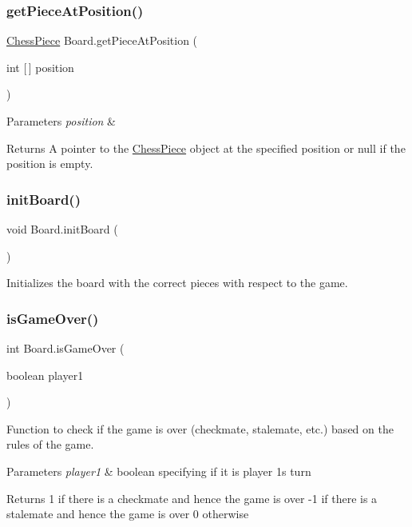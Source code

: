 \subsubsection{\texorpdfstring{get\+Piece\+At\+Position()}{getPieceAtPosition()}}
{\footnotesize\ttfamily \mbox{\hyperlink{class_chess_piece}{Chess\+Piece}} Board.\+get\+Piece\+At\+Position (\begin{DoxyParamCaption}\item[{int \mbox{[}$\,$\mbox{]}}]{position }\end{DoxyParamCaption})}


\begin{DoxyParams}{Parameters}
{\em position} & \\
\hline
\end{DoxyParams}
\begin{DoxyReturn}{Returns}
A pointer to the \mbox{\hyperlink{class_chess_piece}{Chess\+Piece}} object at the specified position or \textquotesingle{}null\textquotesingle{} if the position is empty. 
\end{DoxyReturn}
\mbox{\label{class_board_afe083a69852c9d95ef3f212d5767b1ac}} 
\subsubsection{\texorpdfstring{init\+Board()}{initBoard()}}
{\footnotesize\ttfamily void Board.\+init\+Board (\begin{DoxyParamCaption}{ }\end{DoxyParamCaption})}

Initializes the board with the correct pieces with respect to the game. \mbox{\label{class_board_a8e6efbc4d3b024ca11d5037962c01283}} 
\subsubsection{\texorpdfstring{is\+Game\+Over()}{isGameOver()}}
{\footnotesize\ttfamily int Board.\+is\+Game\+Over (\begin{DoxyParamCaption}\item[{boolean}]{player1 }\end{DoxyParamCaption})}

Function to check if the game is over (checkmate, stalemate, etc.) based on the rules of the game. 
\begin{DoxyParams}{Parameters}
{\em player1} & boolean specifying if it is player 1\textquotesingle{}s turn \\
\hline
\end{DoxyParams}
\begin{DoxyReturn}{Returns}
1 if there is a checkmate and hence the game is over -\/1 if there is a stalemate and hence the game is over 0 otherwise 
\end{DoxyReturn}
\mbox{\label{class_board_ae569166b69247afb243102a1b44f629c}} 

